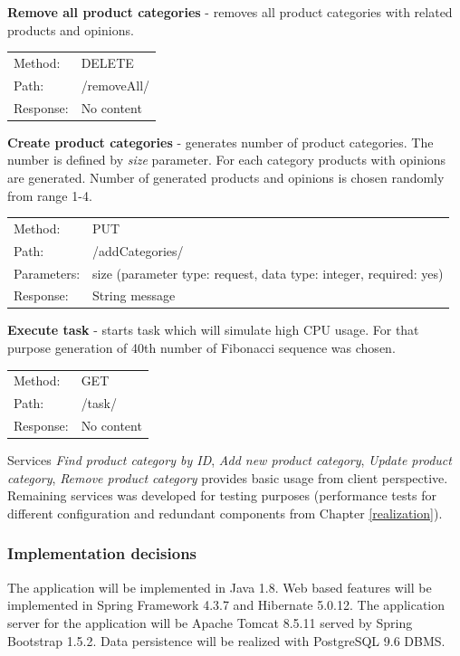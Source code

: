 \documentclass[10pt,a4paper]{article}
\begin{document}
\noindent\textbf{Remove all product categories} - removes all product categories with related products and opinions.

  \begin{tabular}{ll}
  Method: & DELETE \\
  Path: & /removeAll/ \\
  Response: & No content  \\
  \end{tabular} \vspace{5mm}
  
\noindent\textbf{Create product categories} - generates number of product categories. The number is defined by \textit{size} parameter. For each category products with opinions are generated. Number of generated products and opinions is chosen randomly from range 1-4. 

  \begin{tabular}{ll}
  Method: & PUT \\
  Path: & /addCategories/ \\
  Parameters: & size (parameter type: request, data type: integer, required: yes)\\
  Response: & String message  \\
  \end{tabular} \vspace{5mm}

\noindent\textbf{Execute task} - starts task which will simulate high CPU usage. For that purpose generation of 40th number of Fibonacci sequence was chosen. 

  \begin{tabular}{ll}
  Method: & GET \\
  Path: & /task/ \\
  Response: & No content  \\
  \end{tabular} \vspace{2mm}
  
Services \textit{Find product category by ID}, \textit{Add new product category}, \textit{Update product category}, \textit{Remove product category} provides basic usage from client perspective. Remaining services was developed for testing purposes (performance tests for different configuration and redundant components from Chapter \ref{realization}).
  
\subsubsection{Implementation decisions} 
The application will be implemented in Java 1.8. Web based features will be implemented in Spring Framework 4.3.7 and Hibernate 5.0.12. The application server for the application will be Apache Tomcat 8.5.11 served by Spring Bootstrap 1.5.2. Data persistence will be realized with PostgreSQL 9.6 DBMS.  
\end{document}
